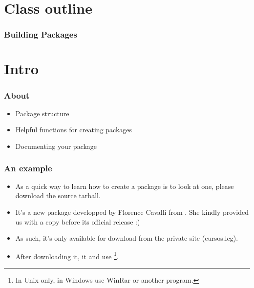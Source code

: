 




\usepackage{Sweave}


\begin{frame}[allowframebreaks]
  \titlepage
\end{frame}

\section*{Class outline}

\begin{frame}[allowframebreaks]
  \frametitle{Building Packages}
  \tableofcontents[hideallsubsections]
\end{frame}

\section{Intro}

\begin{frame}[allowframebreaks]
  \frametitle{About}
  \begin{itemize}
  \item Package structure
  \item Helpful functions for creating packages
  \item Documenting your package
  \end{itemize}
\end{frame}

\begin{frame}[allowframebreaks]
  \frametitle{An example}
  \begin{itemize}
  \item As a quick way to learn how to create a package is to look at one, please download the  source tarball.
  \item It's a new package developped by Florence Cavalli from . She kindly provided us with a copy before its official release :)
  \item As such, it's only available for download from the private site (cursos.lcg).
  \item After downloading it,  it and use \footnote{In Unix only, in Windows use WinRar or another program.}.
  \end{itemize}
\end{frame}

